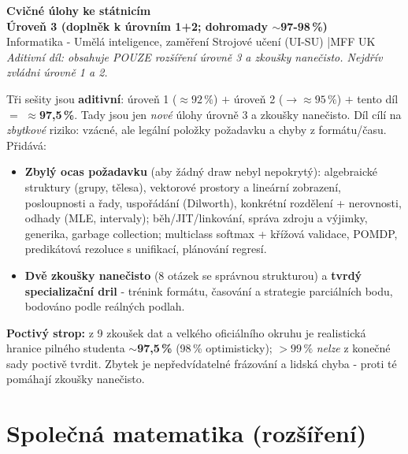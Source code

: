 \documentclass[11pt]{article}
\begin{document}
\begin{center}
  {\LARGE\bfseries\color{mffblue} Cvičné úlohy ke státnicím \\[2pt]
  Úroveň 3 \textnormal{(doplněk k úrovním 1+2; dohromady $\sim$97-98\,\%)}}\\[4pt]
  {\small Informatika - Umělá inteligence, zaměření Strojové učení (UI-SU) \quad|\quad MFF UK}\\[2pt]
  {\footnotesize\itshape Aditivní díl: obsahuje POUZE rozšíření úrovně 3 a zkoušky nanečisto. Nejdřív zvládni úrovně 1 a 2.}
\end{center}

\begin{infobox}[title={Co je tohle a poctivý strop}]
\footnotesize
Tři sešity jsou \textbf{aditivní}: úroveň 1 ($\approx92\,\%$) $+$ úroveň 2 ($\to\approx95\,\%$) $+$ tento díl $=$ $\approx$\textbf{97,5\,\%}. Tady jsou jen \emph{nové} úlohy úrovně 3 a zkoušky nanečisto. Díl cílí na \emph{zbytkové} riziko: vzácné, ale legální položky požadavku a chyby z formátu/času. Přidává:
\begin{itemize}\setlength{\itemsep}{1pt}
  \item \textbf{Zbylý ocas požadavku} (aby žádný draw nebyl nepokrytý): algebraické struktury (grupy, tělesa), vektorové prostory a lineární zobrazení, posloupnosti a řady, uspořádání (Dilworth), konkrétní rozdělení + nerovnosti, odhady (MLE, intervaly); běh/JIT/linkování, správa zdroju a výjimky, generika, garbage collection; multiclass softmax + křížová validace, POMDP, predikátová rezoluce s unifikací, plánování regresí.
  \item \textbf{Dvě zkoušky nanečisto} (8 otázek se správnou strukturou) a \textbf{tvrdý specializační dril} - trénink formátu, časování a strategie parciálních bodu, bodováno podle reálných podlah.
\end{itemize}
\textbf{Poctivý strop:} z 9 zkoušek dat a velkého oficiálního okruhu je realistická hranice pilného studenta $\sim$\textbf{97,5\,\%} (98\,\% optimisticky); $>99\,\%$ \emph{nelze} z konečné sady poctivě tvrdit. Zbytek je nepředvídatelné frázování a lidská chyba - proti té pomáhají zkoušky nanečisto.
\end{infobox}

\tableofcontents
\bigskip

\section{Společná matematika \textnormal{\normalsize(rozšíření)}}






\end{document}
